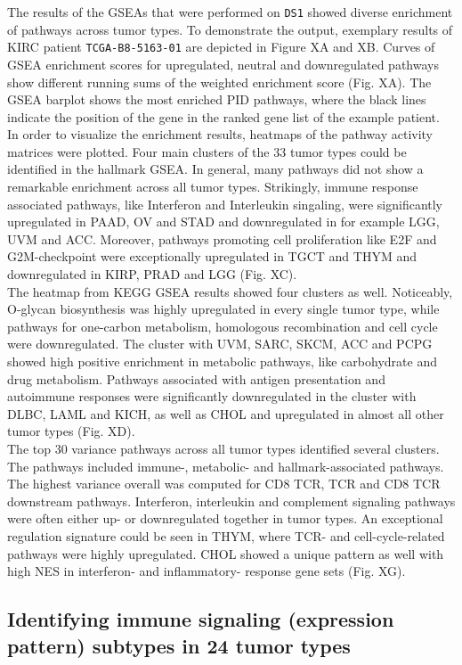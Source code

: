 \documentclass[
  parskip,
  oneside]{scrreprt}
\begin{document}
The results of the GSEAs that were performed on \texttt{DS1} showed
diverse enrichment of pathways across tumor types. To demonstrate the
output, exemplary results of KIRC patient \texttt{TCGA-B8-5163-01} are
depicted in Figure XA and XB. Curves of GSEA enrichment scores for
upregulated, neutral and downregulated pathways show different running
sums of the weighted enrichment score (Fig. XA). The GSEA barplot shows
the most enriched PID pathways, where the black lines indicate the
position of the gene in the ranked gene list of the example patient.\\
In order to visualize the enrichment results, heatmaps of the pathway
activity matrices were plotted. Four main clusters of the 33 tumor types
could be identified in the hallmark GSEA. In general, many pathways did
not show a remarkable enrichment across all tumor types. Strikingly,
immune response associated pathways, like Interferon and Interleukin
singaling, were significantly upregulated in PAAD, OV and STAD and
downregulated in for example LGG, UVM and ACC. Moreover, pathways
promoting cell proliferation like E2F and G2M-checkpoint were
exceptionally upregulated in TGCT and THYM and downregulated in KIRP,
PRAD and LGG (Fig. XC).\\
The heatmap from KEGG GSEA results showed four clusters as well.
Noticeably, O-glycan biosynthesis was highly upregulated in every single
tumor type, while pathways for one-carbon metabolism, homologous
recombination and cell cycle were downregulated. The cluster with UVM,
SARC, SKCM, ACC and PCPG showed high positive enrichment in metabolic
pathways, like carbohydrate and drug metabolism. Pathways associated
with antigen presentation and autoimmune responses were significantly
downregulated in the cluster with DLBC, LAML and KICH, as well as CHOL
and upregulated in almost all other tumor types (Fig. XD).\\
The top 30 variance pathways across all tumor types identified several
clusters. The pathways included immune-, metabolic- and
hallmark-associated pathways. The highest variance overall was computed
for CD8 TCR, TCR and CD8 TCR downstream pathways. Interferon,
interleukin and complement signaling pathways were often either up- or
downregulated together in tumor types. An exceptional regulation
signature could be seen in THYM, where TCR- and cell-cycle-related
pathways were highly upregulated. CHOL showed a unique pattern as well
with high NES in interferon- and inflammatory- response gene sets (Fig.
XG).

\hypertarget{identifying-immune-signaling-expression-pattern-subtypes-in-24-tumor-types}{%
\subsection{Identifying immune signaling (expression pattern) subtypes
in 24 tumor
types}\label{identifying-immune-signaling-expression-pattern-subtypes-in-24-tumor-types}}
\end{document}
